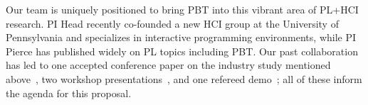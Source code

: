 
Our team is uniquely positioned to bring PBT into this vibrant area
of PL+HCI research.  PI Head recently
co-founded a new HCI group at
the University of Pennsylvania and specializes in interactive
programming environments, while PI Pierce has published widely on PL
topics including PBT.  Our past collaboration has led to
one accepted conference paper on the industry study mentioned above~\cite{ref:goldstein2024property},
two workshop
presentations~\cite{goldstein_problems_2022,shi_towards_2023}, and one
refereed demo~\cite{ref:goldstein2023tyche}; all of these inform the
agenda for this proposal.

